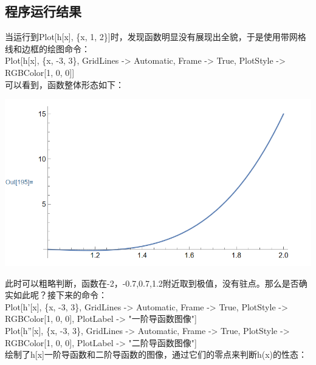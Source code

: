 \documentclass{ctexart}
\begin{document}
\subsection{程序运行结果}
当运行到Plot[h[x], \{x, 1, 2\}]时，发现函数明显没有展现出全貌，于是使用带网格线和边框的绘图命令：\\Plot[h[x], \{x, -3, 3\}, GridLines -> Automatic, Frame -> True, 
PlotStyle -> RGBColor[1, 0, 0]]\\
可以看到，函数整体形态如下：
\begin{center}
	\includegraphics[scale=0.5]{10.png}
\end{center}
此时可以粗略判断，函数在-2，-0.7,0.7,1.2附近取到极值，没有驻点。那么是否确实如此呢？接下来的命令：\\Plot[h'[x], \{x, -3, 3\}, GridLines -> Automatic, Frame -> True, 
PlotStyle -> RGBColor[1, 0, 0], PlotLabel -> "一阶导函数图像"]\\
Plot[h''[x], \{x, -3, 3\}, GridLines -> Automatic, Frame -> True, 
PlotStyle -> RGBColor[1, 0, 0], PlotLabel -> "二阶导函数图像"]\\
绘制了h[x]一阶导函数和二阶导函数的图像，通过它们的零点来判断h(x)的性态：
\end{document}
